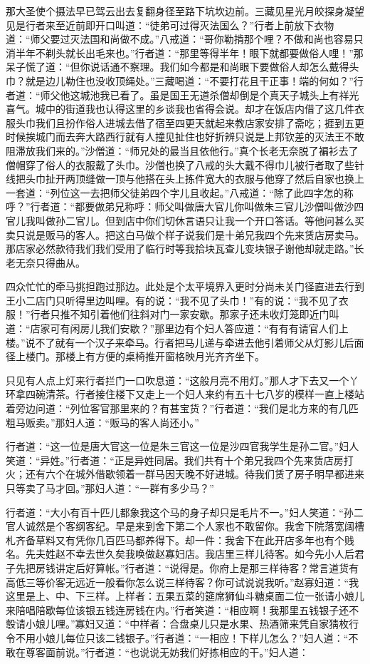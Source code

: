 \documentclass[12pt,UTF8]{ctexbook}
\begin{document}
{	那大圣使个摄法早已驾云出去复翻身径至路下坑坎边前。三藏见星光月皎探身凝望见是行者来至近前即开口叫道：“徒弟可过得灭法国么？”行者上前放下衣物道：“师父要过灭法国和尚做不成。”八戒道：“哥你勒掯那个哩？不做和尚也容易只消半年不剃头就长出毛来也。”行者道：“那里等得半年！眼下就都要做俗人哩！”那呆子慌了道：“但你说话通不察理。我们如今都是和尚眼下要做俗人却怎么戴得头巾？就是边儿勒住也没收顶绳处。”三藏喝道：“不要打花且干正事！端的何如？”行者道：“师父他这城池我已看了。虽是国王无道杀僧却倒是个真天子城头上有祥光喜气。城中的街道我也认得这里的乡谈我也省得会说。却才在饭店内借了这几件衣服头巾我们且扮作俗人进城去借了宿至四更天就起来教店家安排了斋吃；捱到五更时候挨城门而去奔大路西行就有人撞见扯住也好折辨只说是上邦钦差的灭法王不敢阻滞放我们来的。”沙僧道：“师兄处的最当且依他行。”真个长老无奈脱了褊衫去了僧帽穿了俗人的衣服戴了头巾。沙僧也换了八戒的头大戴不得巾儿被行者取了些针线把头巾扯开两顶缝做一顶与他搭在头上拣件宽大的衣服与他穿了然后自家也换上一套道：“列位这一去把师父徒弟四个字儿且收起。”八戒道：“除了此四字怎的称呼？”行者道：“都要做弟兄称呼：师父叫做唐大官儿你叫做朱三官儿沙僧叫做沙四官儿我叫做孙二官儿。但到店中你们切休言语只让我一个开口答话。等他问甚么买卖只说是贩马的客人。把这白马做个样子说我们是十弟兄我四个先来赁店房卖马。那店家必然款待我们我们受用了临行时等我拾块瓦查儿变块银子谢他却就走路。”长老无奈只得曲从。
	
	四众忙忙的牵马挑担跑过那边。此处是个太平境界入更时分尚未关门径直进去行到王小二店门只听得里边叫哩。有的说：“我不见了头巾！”有的说：“我不见了衣服！”行者只推不知引着他们往斜对门一家安歇。那家子还未收灯笼即近门叫道：“店家可有闲房儿我们安歇？”那里边有个妇人答应道：“有有有请官人们上楼。”说不了就有一个汉子来牵马。行者把马儿递与牵进去他引着师父从灯影儿后面径上楼门。那楼上有方便的桌椅推开窗格映月光齐齐坐下。
	
	只见有人点上灯来行者拦门一口吹息道：“这般月亮不用灯。”那人才下去又一个丫环拿四碗清茶。行者接住楼下又走上一个妇人来约有五十七八岁的模样一直上楼站着旁边问道：“列位客官那里来的？有甚宝货？”行者道：“我们是北方来的有几匹粗马贩卖。”那妇人道：“贩马的客人尚还小。”
	
	行者道：“这一位是唐大官这一位是朱三官这一位是沙四官我学生是孙二官。”妇人笑道：“异姓。”行者道：“正是异姓同居。我们共有十个弟兄我四个先来赁店房打火；还有六个在城外借歇领着一群马因天晚不好进城。待我们赁了房子明早都进来只等卖了马才回。”那妇人道：“一群有多少马？”
	
	行者道：“大小有百十匹儿都象我这个马的身子却只是毛片不一。”妇人笑道：“孙二官人诚然是个客纲客纪。早是来到舍下第二个人家也不敢留你。我舍下院落宽阔槽札齐备草料又有凭你几百匹马都养得下。却一件：我舍下在此开店多年也有个贱名。先夫姓赵不幸去世久矣我唤做赵寡妇店。我店里三样儿待客。如今先小人后君子先把房钱讲定后好算帐。”行者道：“说得是。你府上是那三样待客？常言道货有高低三等价客无远近一般看你怎么说三样待客？你可试说说我听。”赵寡妇道：“我这里是上、中、下三样。上样者：五果五菜的筵席狮仙斗糖桌面二位一张请小娘儿来陪唱陪歇每位该银五钱连房钱在内。”行者笑道：“相应啊！我那里五钱银子还不彀请小娘儿哩。”寡妇又道：“中样者：合盘桌儿只是水果、热酒筛来凭自家猜枚行令不用小娘儿每位只该二钱银子。”行者道：“一相应！下样儿怎么？”妇人道：“不敢在尊客面前说。”行者道：“也说说无妨我们好拣相应的干。”妇人道：
	
}
\end{document}

